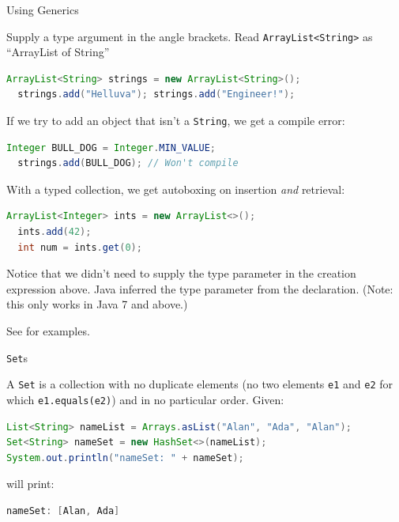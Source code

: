 \documentclass{beamer}
\begin{document}
\begin{frame}[fragile]{Using Generics}


Supply a type argument in the angle brackets.  Read {\tt ArrayList<String>} as ``ArrayList of String''
\begin{lstlisting}[language=Java]
  ArrayList<String> strings = new ArrayList<String>();
  strings.add("Helluva"); strings.add("Engineer!");
\end{lstlisting}
If we try to add an object that isn't a {\tt String}, we get a compile error:
\begin{lstlisting}[language=Java]
  Integer BULL_DOG = Integer.MIN_VALUE;
  strings.add(BULL_DOG); // Won't compile
\end{lstlisting}

With a typed collection, we get autoboxing on insertion {\it and} retrieval:

\begin{lstlisting}[language=Java]
  ArrayList<Integer> ints = new ArrayList<>();
  ints.add(42);
  int num = ints.get(0);
\end{lstlisting}
Notice that we didn't need to supply the type parameter in the creation expression above.  Java inferred the type parameter from the declaration. (Note: this only works in Java 7 and above.)

See  for examples.

\end{frame}

\begin{frame}[fragile]{{\tt Set}s}

A {\tt Set} is a collection with no duplicate elements (no two elements {\tt e1} and {\tt e2} for which {\tt e1.equals(e2)}) and in no particular order.  Given:
\begin{lstlisting}[language=Java]
List<String> nameList = Arrays.asList("Alan", "Ada", "Alan");
Set<String> nameSet = new HashSet<>(nameList);
System.out.println("nameSet: " + nameSet);
\end{lstlisting}
will print:
\begin{lstlisting}[language=Java]
nameSet: [Alan, Ada]
\end{lstlisting}

\end{frame}
\end{document}
